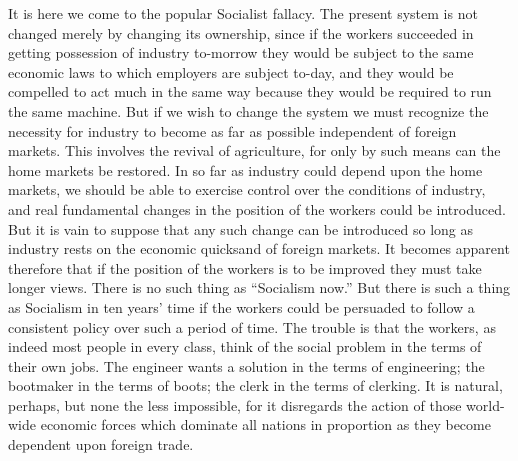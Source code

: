 \documentclass{book}
\begin{document}
It is here we come to the popular Socialist fallacy. The present system is not changed merely by changing its ownership, since if the workers succeeded in getting possession of industry to-morrow they would be subject to the same economic laws to which employers are subject to-day, and they would be compelled to act much in the same way because they would be required to run the same machine. But if we wish to change the system we must recognize the necessity for industry to become as far as possible independent of foreign markets. This involves the revival of agriculture, for only by such means can the home markets be restored. In so far as industry could depend upon the home markets, we should be able to exercise control over the conditions of industry, and real fundamental changes in the position of the workers could be introduced. But it is vain to suppose that any such change can be introduced so long as industry rests on the economic quicksand of foreign markets. It becomes apparent therefore that if the position of the workers is to be improved they must take longer views. There is no such thing as “Socialism now.” But there is such a thing as Socialism in ten years’ time if the workers could be persuaded to follow a consistent policy over such a period of time. The trouble is that the workers, as indeed most people in every class, think of the social problem in the terms of their own jobs. The engineer wants a solution in the terms of engineering; the bootmaker in the terms of boots; the clerk in the terms of clerking. It is natural, perhaps, but none the less impossible, for it disregards the action of those world-wide economic forces which dominate all nations in proportion as they become dependent upon foreign trade.
\end{document}
